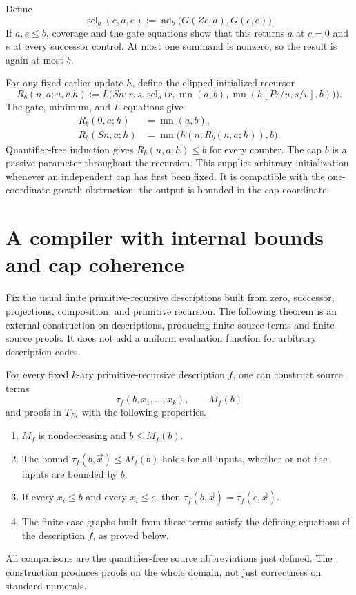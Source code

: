 Define
\[
 \operatorname{sel}_b(c,a,e):=
 \operatorname{ad}_b\bigl(G(Zc,a),G(c,e)\bigr).
\]
If $a,e\leq b$, coverage and the gate equations show that this returns
$a$ at $c=0$ and $e$ at every successor control.  At most one summand
is nonzero, so the result is again at most $b$.

For any fixed earlier update $h$, define the clipped initialized recursor
\[
 R_b(n,a;u,v.h):=
 L\bigl(Sn;r,s.
 \operatorname{sel}_b\bigl(r,\operatorname{mn}(a,b),
        \operatorname{mn}(h[Pr/u,s/v],b)\bigr)\bigr).
 \tag{Clipped recursion}\label{eq:ib-clipped-recursion}
\]
The gate, minimum, and $L$ equations give
\begin{align}
 R_b(0,a;h)&=\operatorname{mn}(a,b),\label{eq:ib-R0}\\
 R_b(Sn,a;h)&=
 \operatorname{mn}\bigl(h(n,R_b(n,a;h)),b\bigr).
 \label{eq:ib-RS}
\end{align}
Quantifier-free induction gives $R_b(n,a;h)\leq b$ for every counter.
The cap $b$ is a passive parameter throughout the recursion.
This supplies arbitrary initialization whenever an independent cap
has first been fixed.  It is compatible with the one-coordinate growth
obstruction: the output is bounded in the cap coordinate.

\section{A compiler with internal bounds and cap coherence}
\label{sec:internal-compiler}

Fix the usual finite primitive-recursive descriptions built from zero,
successor, projections, composition, and primitive recursion.  The
following theorem is an external construction on descriptions, producing
finite source terms and finite source proofs.  It does not add a uniform
evaluation function for arbitrary description codes.

\begin{theorem}
\label{thm:internal-bounded-realization}
For every fixed $k$-ary primitive-recursive description $f$, one can
construct source terms
\[
                     \tau_f(b,x_1,\ldots,x_k),\qquad M_f(b)
\]
and proofs in $T_{B\epsilon}$ with the following properties.
\begin{enumerate}
\item $M_f$ is nondecreasing and $b\leq M_f(b)$.
\item The bound $\tau_f(b,\vec x)\leq M_f(b)$ holds for all inputs,
      whether or not the inputs are bounded by $b$.
\item If every $x_i\leq b$ and every $x_i\leq c$, then
      $\tau_f(b,\vec x)=\tau_f(c,\vec x)$.
\item The finite-case graphs built from these terms satisfy the defining
      equations of the description $f$, as proved below.
\end{enumerate}
All comparisons are the quantifier-free source abbreviations just
defined.  The construction produces proofs on the whole domain,
not just correctness on standard numerals.
\end{theorem}

